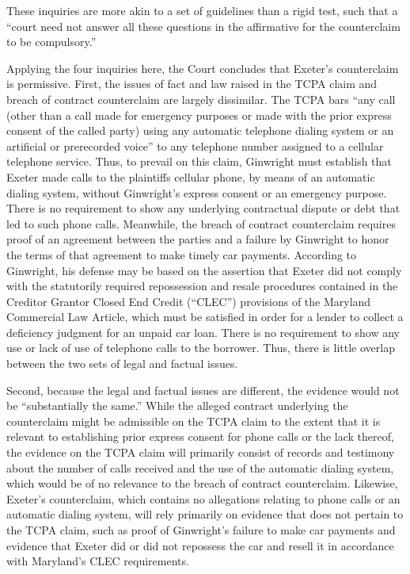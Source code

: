 \documentclass[11pt,letterpaper,twoside]{article}
\begin{document}
These inquiries are more akin to a set of guidelines than a rigid test,
such that a ``court need not answer all these questions in the
affirmative for the counterclaim to be compulsory.''

Applying the four inquiries here, the Court concludes that Exeter's
counterclaim is permissive. First, the issues of fact and law raised in
the TCPA claim and breach of contract counterclaim are largely
dissimilar. The TCPA bars ``any call (other than a call made for
emergency purposes or made with the prior express consent of the called
party) using any automatic telephone dialing system or an artificial or
prerecorded voice'' to any telephone number assigned to a cellular
telephone service. Thus, to prevail on this claim, Ginwright must
establish that Exeter made calls to the plaintiffs cellular phone, by
means of an automatic dialing system, without Ginwright's express
consent or an emergency purpose. There is no requirement to show any
underlying contractual dispute or debt that led to such phone calls.
Meanwhile, the breach of contract counterclaim requires proof of an
agreement between the parties and a failure by Ginwright to honor the
terms of that agreement to make timely car payments. According to
Ginwright, his defense may be based on the assertion that Exeter did not
comply with the statutorily required repossession and resale procedures
contained in the Creditor Grantor Closed End Credit (``CLEC'')
provisions of the Maryland Commercial Law Article, which must be
satisfied in order for a lender to collect a deficiency judgment for an
unpaid car loan. There is no requirement to show any use or lack of use
of telephone calls to the borrower. Thus, there is little overlap
between the two sets of legal and factual issues.

Second, because the legal and factual issues are different, the evidence
would not be ``substantially the same.'' While the alleged contract
underlying the counterclaim might be admissible on the TCPA claim to the
extent that it is relevant to establishing prior express consent for
phone calls or the lack thereof, the evidence on the TCPA claim will
primarily consist of records and testimony about the number of calls
received and the use of the automatic dialing system, which would be of
no relevance to the breach of contract counterclaim. Likewise, Exeter's
counterclaim, which contains no allegations relating to phone calls or
an automatic dialing system, will rely primarily on evidence that does
not pertain to the TCPA claim, such as proof of Ginwright's failure to
make car payments and evidence that Exeter did or did not repossess the
car and resell it in accordance with Maryland's CLEC requirements.
\end{document}

